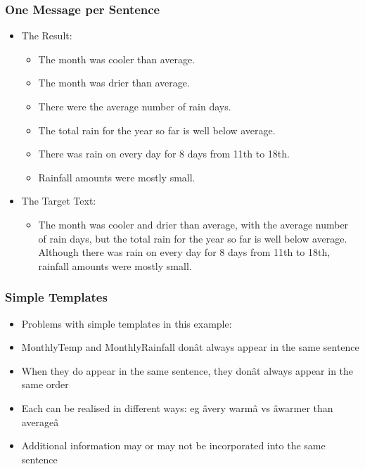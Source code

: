\documentclass[compress,color=usenames]{beamer}
\begin{document}
\begin{frame}
\frametitle{One Message per Sentence}

\label{f192}
\begin{itemize}
\item { {The Result:}}
\begin{itemize}
\item The month was cooler than average.
\item The month was drier than average.
\item There were the average number of rain days.
\item The total rain for the year so far is well below average. 
\item There was rain on every day for 8 days from 11th to 18th.
\item Rainfall amounts were mostly small.
\end{itemize}
\item { {The Target Text:}}
\begin{itemize}
\item The month was cooler and drier than average, with the average number of rain days, but the total rain for the year so far is well below average. 
Although there was rain on every day for 8 days from 11th to 18th, rainfall amounts were mostly small.
\end{itemize}
\end{itemize}
 
\end{frame}

\begin{frame}
\frametitle{Simple Templates}

\label{f194}
\begin{itemize}
\item { {Problems with simple templates in this example:}}
\item { {MonthlyTemp and MonthlyRainfall don\^at always appear in the same sentence}}
\item { {When they do appear in the same sentence, they don\^at always appear in the same order}}
\item { {Each can be realised in different ways: eg \^avery warm\^a vs \^awarmer than average\^a}}
\item { {Additional information may or may not be incorporated into the same sentence}}
\end{itemize}
 
\end{frame}
\end{document}
